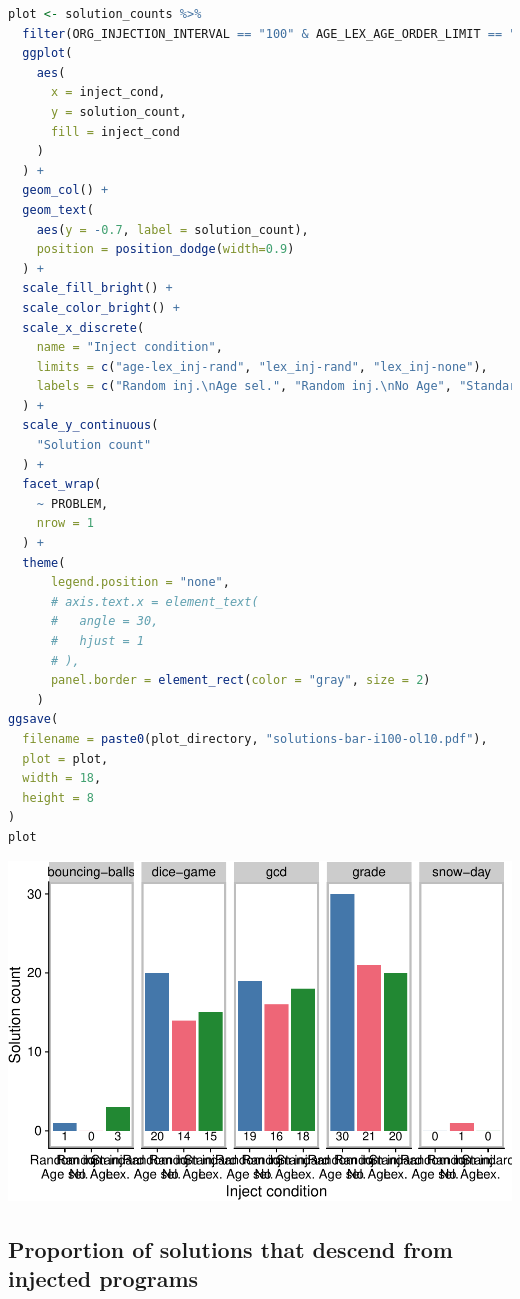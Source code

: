 \documentclass[
]{book}
\begin{document}
\begin{lstlisting}[language=R]
plot <- solution_counts %>%
  filter(ORG_INJECTION_INTERVAL == "100" & AGE_LEX_AGE_ORDER_LIMIT == "10") %>%
  ggplot(
    aes(
      x = inject_cond,
      y = solution_count,
      fill = inject_cond
    )
  ) +
  geom_col() +
  geom_text(
    aes(y = -0.7, label = solution_count),
    position = position_dodge(width=0.9)
  ) +
  scale_fill_bright() +
  scale_color_bright() +
  scale_x_discrete(
    name = "Inject condition",
    limits = c("age-lex_inj-rand", "lex_inj-rand", "lex_inj-none"),
    labels = c("Random inj.\nAge sel.", "Random inj.\nNo Age", "Standard\nLex.")
  ) +
  scale_y_continuous(
    "Solution count"
  ) +
  facet_wrap(
    ~ PROBLEM,
    nrow = 1
  ) +
  theme(
      legend.position = "none",
      # axis.text.x = element_text(
      #   angle = 30,
      #   hjust = 1
      # ),
      panel.border = element_rect(color = "gray", size = 2)
    )
ggsave(
  filename = paste0(plot_directory, "solutions-bar-i100-ol10.pdf"),
  plot = plot,
  width = 18,
  height = 8
)
plot
\end{lstlisting}

\includegraphics{age-based-lex-supplemental_files/figure-latex/unnamed-chunk-8-1.pdf}

\hypertarget{proportion-of-solutions-that-descend-from-injected-programs}{%
\subsection{Proportion of solutions that descend from injected programs}\label{proportion-of-solutions-that-descend-from-injected-programs}}
\end{document}
